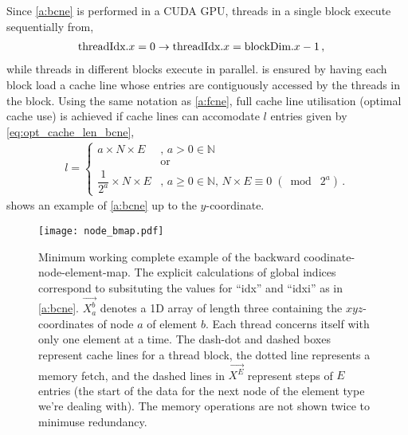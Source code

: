 Since \cref{a:bcne} is performed in a CUDA GPU, threads in a single block execute sequentially from,
\begin{align}
	\textrm{threadIdx}.x & = 0 \to \textrm{threadIdx}.x = \textrm{blockDim}.x - 1\,,
\end{align}
while threads in different blocks execute in parallel.  is ensured by having each block load a cache line whose entries are contiguously accessed by the threads in the block. Using the same notation as \cref{a:fcne}, full cache line utilisation (optimal cache use) is achieved if cache lines can accomodate $ l $ entries given by \cref{eq:opt_cache_len_bcne},
\begin{align}
	\label{eq:opt_cache_len_bcne}
	l =
	\begin{cases}
		a \times N \times E                & ,\, a > 0 \in \mathbb{N}                                                \\
		                                   & \textrm{or}                                                             \\
		\dfrac{1}{2^{a}} \times N \times E & ,\, a \geq 0 \in \mathbb{N},\, N \times E \equiv 0\; (\bmod\; 2^{a})\,.
	\end{cases}
\end{align}
 shows an example of \cref{a:bcne} up to the $ y $-coordinate.
\begin{figure}
	\centering
	\texttt{[image: node\_bmap.pdf]}
	\caption[Example of the backward coodinate-node-element-map.]{Minimum working complete example of the backward coodinate-node-element-map. The explicit calculations of global indices correspond to subsituting the values for ``idx'' and ``idxi'' as in \cref{a:bcne}. $\vec{X_{a}^{b}}$ denotes a 1D array of length three containing the $ xyz $-coordinates of node $ a $ of element $ b $. Each thread concerns itself with only one element at a time. The dash-dot and dashed boxes represent cache lines for a thread block, the dotted line represents a memory fetch, and the dashed lines in $ \vec{X^{E}} $ represent steps of $ E $ entries (the start of the data for the next node of the element type we're dealing with). The memory operations are not shown twice to minimuse redundancy.}
	\label{f:fcne_eg}
\end{figure}
